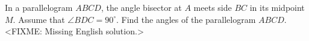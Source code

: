 \problem
In a parallelogram $ABCD$, the angle bisector at $A$ meets side $BC$ in its
midpoint $M$.
Assume that $\angle BDC = 90^\circ$.
Find the angles of the parallelogram $ABCD$.
\solution
<FIXME: Missing English solution.>
\endproblem
